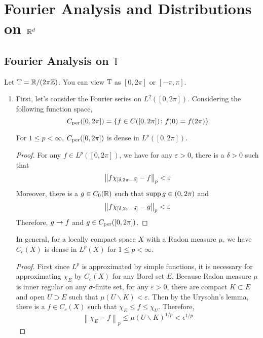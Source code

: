 \chapter{Fourier Analysis and Distributions on \texorpdfstring{$\mathbb{R}^d$}{Rd}}

\section{Fourier Analysis on \texorpdfstring{$\mathbb{T}$}{T}}
Let $\mathbb{T} = \mathbb{R} / (2\pi \mathbb{Z})$. You can view $\mathbb{T}$ as $[0,2\pi]$ or $[-\pi,\pi]$.
\begin{enumerate}[label=\arabic*.]
	\item First, let's consider the Fourier series on $L^2([0,2\pi])$. Considering the following function space,
	\begin{equation*}
		C_{\operatorname{per}}([0,2\pi]) = \left\{f \in C([0,2\pi]) \colon f(0) = f(2\pi)\right\}
	\end{equation*}
	\begin{prop}
		For $1\leq p < \infty$, $C_{\operatorname{per}}([0,2\pi])$ is dense in $L^p([0,2\pi])$.
	\end{prop}
	\begin{proof}
		For any $f \in L^p([0,2\pi])$, we have for any $\varepsilon > 0$, there is a $\delta > 0$ such that
		\begin{equation*}
			\left\lVert f\chi_{[\delta,2\pi-\delta]}-f\right\lVert_p < \varepsilon
		\end{equation*}
		Moreover, there is a $g \in C_0(\mathbb{R})$ such that $\operatorname{supp} g \in (0,2\pi)$ and 
		\begin{equation*}
			\left\lVert f\chi_{[\delta,2\pi-\delta]}-g\right\lVert_p < \varepsilon
		\end{equation*}
		Therefore, $g \rightarrow f$ and $g \in C_{\operatorname{per}}([0,2\pi])$.
	\end{proof}
	\begin{rmk}
		In general, for a locally compact space $X$ with a Radon measure $\mu$, we have $C_c(X)$ is dense in $L^p(X)$ for $1\leq p < \infty$.
		\begin{proof}
			First since $L^p$ is approximated by simple functions, it is necessary for approximating $\chi_E$ by $C_c(X)$ for any Borel set $E$. Because Radon measure $\mu$ is inner regular on any $\sigma$-finite set, for any $\varepsilon > 0$, there are compact $K \subset E$ and open $U \supset E$ such that $\mu(U \backslash K) < \varepsilon$. Then by the Urysohn's lemma, there is a $f \in C_c(X)$ such that $\chi_E \leq f \leq \chi_U$. Therefore, 
			\begin{equation*}
				\left\|\chi_E-f\right\|_p \leq \mu(U \backslash K)^{1 / p}<\epsilon^{1 / p}
			\end{equation*}
		\end{proof}
	\end{rmk}


\end{enumerate}

